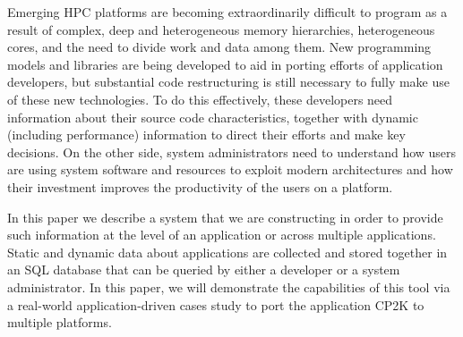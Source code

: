Emerging HPC platforms are becoming extraordinarily difficult to program as a result of complex, deep and heterogeneous memory hierarchies, heterogeneous cores, and the need to divide work and data among them.
New programming models and libraries are being developed to aid in porting efforts of application developers, but substantial code restructuring is still necessary to fully make use of these new technologies.
To do this effectively, these developers need information about their source code characteristics, together with dynamic (including performance) information to direct their efforts and make key decisions.
On the other side, system administrators need to understand how users are using system software and resources to exploit modern architectures and how their investment improves the productivity of the users on a platform.

In this paper we describe a system that we are constructing in order to provide such information at the level of an application or across multiple applications.
Static and dynamic data about applications are collected and stored together in an \acs{SQL} database that can be queried by either a developer or a system administrator.
In this paper, we will demonstrate the capabilities of this tool via a real-world application-driven cases study to port the application CP2K to multiple platforms.

